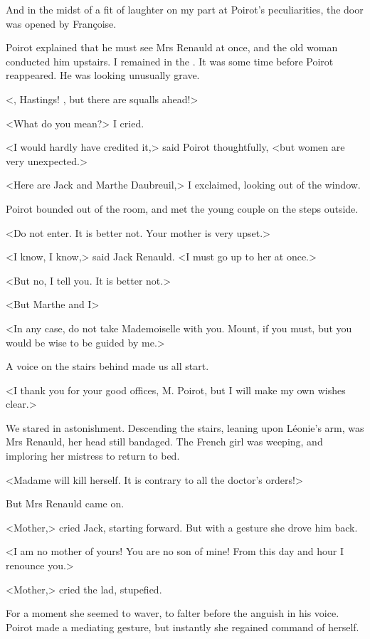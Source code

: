  And in the midst of a fit of laughter on my part at Poirot's peculiarities, the door was opened by Françoise. 

 Poirot explained that he must see Mrs Renauld at once, and the old woman conducted him upstairs. I remained in the . It was some time before Poirot reappeared. He was looking unusually grave. 

 <, Hastings! , but there are squalls ahead!> 

 <What do you mean?> I cried. 

 <I would hardly have credited it,> said Poirot thoughtfully, <but women are very unexpected.> 

 <Here are Jack and Marthe Daubreuil,> I exclaimed, looking out of the window. 

 Poirot bounded out of the room, and met the young couple on the steps outside. 

 <Do not enter. It is better not. Your mother is very upset.> 

 <I know, I know,> said Jack Renauld. <I must go up to her at once.> 

 <But no, I tell you. It is better not.> 

 <But Marthe and I\longdash> 

 <In any case, do not take Mademoiselle with you. Mount, if you must, but you would be wise to be guided by me.> 

 A voice on the stairs behind made us all start. 

 <I thank you for your good offices, M. Poirot, but I will make my own wishes clear.> 

 We stared in astonishment. Descending the stairs, leaning upon Léonie's arm, was Mrs Renauld, her head still bandaged. The French girl was weeping, and imploring her mistress to return to bed. 

 <Madame will kill herself. It is contrary to all the doctor's orders!> 

 But Mrs Renauld came on. 

 <Mother,> cried Jack, starting forward. But with a gesture she drove him back. 

 <I am no mother of yours! You are no son of mine! From this day and hour I renounce you.> 

 <Mother,> cried the lad, stupefied. 

 For a moment she seemed to waver, to falter before the anguish in his voice. Poirot made a mediating gesture, but instantly she regained command of herself. 

